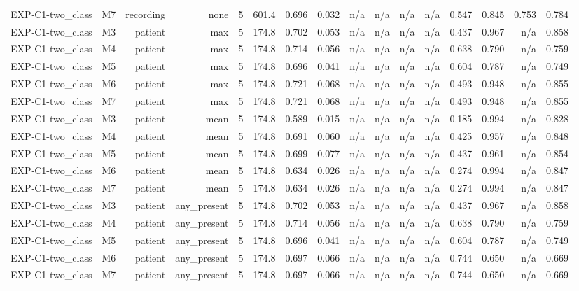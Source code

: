 \begin{table}[htbp]
\begin{tabular}{lrrrrrrrrrrrrrrr}
    EXP-C1-two\_class & M7 & recording & none & 5 & 601.4 & 0.696 & 0.032 & n/a & n/a & n/a & n/a & 0.547 & 0.845 & 0.753 & 0.784 \\
    EXP-C1-two\_class & M3 & patient & max & 5 & 174.8 & 0.702 & 0.053 & n/a & n/a & n/a & n/a & 0.437 & 0.967 & n/a & 0.858 \\
    EXP-C1-two\_class & M4 & patient & max & 5 & 174.8 & 0.714 & 0.056 & n/a & n/a & n/a & n/a & 0.638 & 0.790 & n/a & 0.759 \\
    EXP-C1-two\_class & M5 & patient & max & 5 & 174.8 & 0.696 & 0.041 & n/a & n/a & n/a & n/a & 0.604 & 0.787 & n/a & 0.749 \\
    EXP-C1-two\_class & M6 & patient & max & 5 & 174.8 & 0.721 & 0.068 & n/a & n/a & n/a & n/a & 0.493 & 0.948 & n/a & 0.855 \\
    EXP-C1-two\_class & M7 & patient & max & 5 & 174.8 & 0.721 & 0.068 & n/a & n/a & n/a & n/a & 0.493 & 0.948 & n/a & 0.855 \\
    EXP-C1-two\_class & M3 & patient & mean & 5 & 174.8 & 0.589 & 0.015 & n/a & n/a & n/a & n/a & 0.185 & 0.994 & n/a & 0.828 \\
    EXP-C1-two\_class & M4 & patient & mean & 5 & 174.8 & 0.691 & 0.060 & n/a & n/a & n/a & n/a & 0.425 & 0.957 & n/a & 0.848 \\
    EXP-C1-two\_class & M5 & patient & mean & 5 & 174.8 & 0.699 & 0.077 & n/a & n/a & n/a & n/a & 0.437 & 0.961 & n/a & 0.854 \\
    EXP-C1-two\_class & M6 & patient & mean & 5 & 174.8 & 0.634 & 0.026 & n/a & n/a & n/a & n/a & 0.274 & 0.994 & n/a & 0.847 \\
    EXP-C1-two\_class & M7 & patient & mean & 5 & 174.8 & 0.634 & 0.026 & n/a & n/a & n/a & n/a & 0.274 & 0.994 & n/a & 0.847 \\
    EXP-C1-two\_class & M3 & patient & any\_present & 5 & 174.8 & 0.702 & 0.053 & n/a & n/a & n/a & n/a & 0.437 & 0.967 & n/a & 0.858 \\
    EXP-C1-two\_class & M4 & patient & any\_present & 5 & 174.8 & 0.714 & 0.056 & n/a & n/a & n/a & n/a & 0.638 & 0.790 & n/a & 0.759 \\
    EXP-C1-two\_class & M5 & patient & any\_present & 5 & 174.8 & 0.696 & 0.041 & n/a & n/a & n/a & n/a & 0.604 & 0.787 & n/a & 0.749 \\
    EXP-C1-two\_class & M6 & patient & any\_present & 5 & 174.8 & 0.697 & 0.066 & n/a & n/a & n/a & n/a & 0.744 & 0.650 & n/a & 0.669 \\
    EXP-C1-two\_class & M7 & patient & any\_present & 5 & 174.8 & 0.697 & 0.066 & n/a & n/a & n/a & n/a & 0.744 & 0.650 & n/a & 0.669 \\

\end{tabular}
\end{table}
